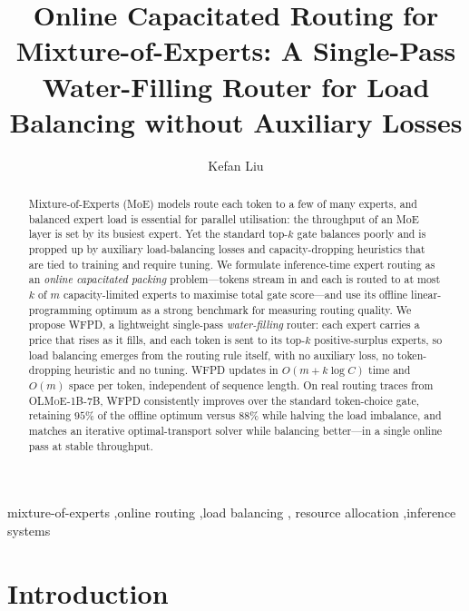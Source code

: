 \documentclass[preprint,12pt]{elsarticle}
\theoremstyle{plain}
\theoremstyle{remark}
\begin{document}
\begin{frontmatter}

\title{Online Capacitated Routing for Mixture-of-Experts:
A Single-Pass Water-Filling Router for Load Balancing without Auxiliary
Losses}

\author{Kefan Liu}

\begin{abstract}
Mixture-of-Experts (MoE) models route each token to a few of many experts,
and balanced expert load is essential for parallel utilisation: the
throughput of an MoE layer is set by its busiest expert. Yet the standard
top-$k$ gate balances poorly and is propped up by auxiliary load-balancing
losses and capacity-dropping heuristics that are tied to training and
require tuning. We formulate inference-time expert routing as an
\emph{online capacitated packing} problem---tokens stream in and each is
routed to at most $k$ of $m$ capacity-limited experts to maximise total
gate score---and use its offline linear-programming optimum as a strong
benchmark for measuring routing quality. We propose WFPD, a lightweight
single-pass \emph{water-filling} router: each expert carries a price that
rises as it fills, and each token is sent to its top-$k$ positive-surplus
experts, so load balancing emerges from the routing rule itself, with no
auxiliary loss, no token-dropping heuristic and no tuning. WFPD updates in
$O(m+k\log C)$ time and $O(m)$ space per token, independent of sequence
length. On real routing traces from \textsc{OLMoE-1B-7B}, WFPD consistently
improves over the standard token-choice gate, retaining $95\%$ of the
offline optimum versus $88\%$ while halving the load imbalance, and matches
an iterative optimal-transport solver while balancing better---in a single
online pass at stable throughput.
\end{abstract}

\begin{keyword}
mixture-of-experts \sep online routing \sep load balancing \sep
resource allocation \sep inference systems
\end{keyword}

\end{frontmatter}

\section{Introduction}
\label{sec:intro}
\end{document}
